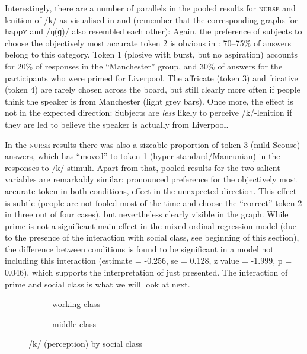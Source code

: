 Interestingly, there are a number of parallels in the pooled results for \textsc{nurse} and lenition of /k/ as visualised in  and  (remember that the corresponding graphs for happ\textsc{y} and /ŋ(ɡ)/ also resembled each other):
Again, the preference of subjects to choose the objectively most accurate token 2 is obvious in : 70--75\% of answers belong to this category.
Token 1 (plosive with burst, but no aspiration) accounts for 20\% of responses in the ``Manchester'' group, and 30\% of answers for the participants who were primed for Liverpool.
The affricate (token 3) and fricative (token 4) are rarely chosen across the board, but still clearly more often if people think the speaker is from Manchester (light grey bars).
Once more, the  effect is not in the expected direction: Subjects are \emph{less} likely to perceive /k/-lenition if they are led to believe the speaker is actually from Liverpool.

In the \textsc{nurse} results there was also a sizeable proportion of token 3 (mild Scouse) answers, which has ``moved'' to token 1 (hyper standard/Mancunian) in the responses to /k/ stimuli.
Apart from that, pooled results for the two salient variables are remarkably similar: pronounced preference for the objectively most accurate token in both conditions,  effect in the unexpected direction.
This  effect is subtle (people are not fooled most of the time and choose the ``correct'' token 2 in three out of four cases), but nevertheless clearly visible in the graph.
While prime is not a significant main effect in the mixed ordinal regression model (due to the presence of the interaction with social class, see beginning of this section), the difference between conditions is found to be significant in a model not including this interaction (estimate = -0.256, se = 0.128, z value = -1.999, p = 0.046), which supports the interpretation of  just presented.
The interaction of prime and social class is what we will look at next.

\begin{figure}
	
	\begin{subfigure}{0.49\textwidth}
		
			\resizebox{\linewidth}{!}{} 
		\caption{working class}
		\label{fig.bar.k.ext.wc}
	\end{subfigure}
	\begin{subfigure}{0.49\textwidth}
		
			\resizebox{\linewidth}{!}{} 
		\caption{middle class}
		\label{fig.bar.k.ext.mc}
	\end{subfigure}
	\caption{/k/ (perception) by social class}
	\label{fig.bar.k.ext.class}
\end{figure}

